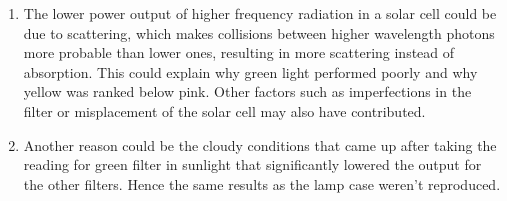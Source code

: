 \begin{enumerate}
		\item The lower power output of higher frequency radiation in a solar cell could be due to scattering, which makes collisions between higher wavelength photons more probable than lower ones, resulting in more scattering instead of absorption. This could explain why green light performed poorly and why yellow was ranked below pink. Other factors such as imperfections in the filter or misplacement of the solar cell may also have contributed.
		
		\item Another reason could be the cloudy conditions that came up after taking the reading for green filter in sunlight that significantly lowered the output for the other filters. Hence the same results as the lamp case weren't reproduced.
	\end{enumerate}
